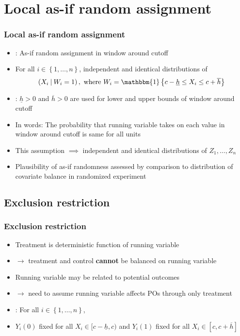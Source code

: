 \documentclass[table, xcolor = {dvipsnames}, 9pt]{beamer}
\newcommand\given[1][]{\:#1\vert\:}
\theoremstyle{plain}
\newcommand{\bh}[1]{{\color{blue}{#1}}}
\newcommand{\mh}[1]{{\color{magenta}{#1}}}
\begin{document}
\section{Local as-if random assignment}
\begin{frame}
\frametitle{Local as-if random assignment} 
\vfill
\begin{itemize} \vfill
\item \bh{Key assumption}: As-if random assignment in window around cutoff \vfill
\item[] For all $i \in \left\{1, \ldots , n\right\}$, independent and identical distributions of \vfill
\begin{align*}
\left(X_i \given W_i = 1\right), \text{ where } W_i = \mathbbm{1}\left\{c - \underline{h} \leq X_i \leq c + \overline{h}\right\}
\end{align*} \vfill
\item \mh{Note}: $\underline{h} > 0$ and $\overline{h} > 0$ are used for lower and upper bounds of window around cutoff \vfill
\item In words: The probability that running variable takes on each value in window around cutoff is same for all units \vfill
\item[] This assumption $\implies$ independent and identical distributions of $Z_1, \ldots , Z_n$ \vfill
\item Plausibility of as-if randomness assessed by comparison to distribution of covariate balance in randomized experiment \citep{hansenbowers2008} \vfill
\end{itemize} \vfill
\end{frame}
\subsection{Exclusion restriction}
\begin{frame}
\frametitle{Exclusion restriction} 
\vfill
\begin{itemize} \vfill
\item Treatment is deterministic function of running variable \vfill
\item[] $\rightarrow$ treatment and control \textbf{cannot} be balanced on running variable \vfill
\item Running variable may be related to potential outcomes \vfill
\item[] $\rightarrow$ need to assume running variable affects POs through only treatment \citep{sekhontitiunik2017} \vfill
\item \bh{Exclusion restriction}: For all $i \in \left\{1, \ldots , n\right\}$, \vfill 
\item[] $Y_i(0)$ fixed for all $X_i \in [c - \underline{h}, c)$ and $Y_i(1)$ fixed for all $X_i \in [c, c + \overline{h}]$ \vfill
\end{itemize} \vfill
\end{frame}
\end{document}
